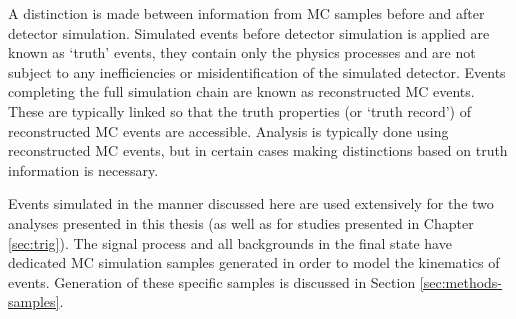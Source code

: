 A distinction is made between information from \ac{MC} samples before and after
detector simulation. Simulated events before detector simulation is applied are
known as `truth' events, they contain only the physics processes and are not
subject to any inefficiencies or misidentification of the simulated detector.
Events completing the full simulation chain are known as reconstructed \ac{MC}
events. These are typically linked so that the truth properties (or `truth
record') of reconstructed \ac{MC} events are accessible. Analysis is typically
done using reconstructed \ac{MC} events, but in certain cases making
distinctions based on truth information is necessary.

Events simulated in the manner discussed here are used extensively for the two
analyses presented in this thesis (as well as for studies presented in Chapter
\ref{sec:trig}). The signal process and all backgrounds in the final state have
dedicated \ac{MC} simulation samples generated in order to model the kinematics
of events. Generation of these specific samples is discussed in Section
\ref{sec:methods-samples}.
